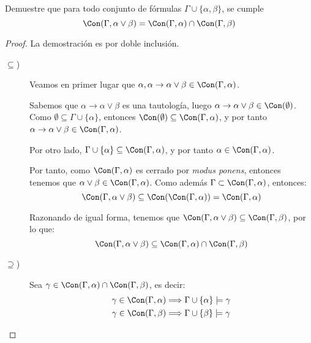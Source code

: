 \begin{ejercicio}
    Demuestre que para todo conjunto de fórmulas $\Gamma\cup\{\alpha,\beta\}$, se cumple
    \begin{equation*}
        \Con(\Gamma,\alpha\lor\beta) = \Con(\Gamma,\alpha) \cap \Con(\Gamma,\beta)
    \end{equation*}

    \begin{proof}
        La demostración es por doble inclusión.
        \begin{description}
            \item [$\subseteq$)] Veamos en primer lugar que $\alpha, \alpha\rightarrow\alpha\lor\beta\in \Con(\Gamma,\alpha)$.
            
                Sabemos que $\alpha\rightarrow\alpha\lor\beta$ es una tautología, luego
                $\alpha\rightarrow\alpha\lor\beta\in \Con(\emptyset)$.
                Como $\emptyset\subseteq \Gamma\cup\{\alpha\}$, entonces $\Con(\emptyset)\subseteq \Con(\Gamma,\alpha)$, y por tanto $\alpha\rightarrow\alpha\lor\beta\in \Con(\Gamma,\alpha)$.

                Por otro lado, $\Gamma\cup \{\alpha\}\subseteq \Con(\Gamma,\alpha)$, y por tanto $\alpha\in \Con(\Gamma,\alpha)$.

                Por tanto, como $\Con(\Gamma,\alpha)$ es cerrado por \emph{modus ponens}, entonces tenemos que $\alpha\lor\beta\in \Con(\Gamma,\alpha)$.
                Como además $\Gamma\subset \Con(\Gamma,\alpha)$, entonces:
                \begin{equation*}
                    \Con(\Gamma,\alpha\lor\beta)\subseteq \Con(\Con(\Gamma,\alpha)) = \Con(\Gamma,\alpha)
                \end{equation*}

                Razonando de igual forma, tenemos que $\Con(\Gamma,\alpha\lor\beta)\subseteq \Con(\Gamma,\beta)$, por lo que:
                \begin{equation*}
                    \Con(\Gamma,\alpha\lor\beta)\subseteq \Con(\Gamma,\alpha)\cap \Con(\Gamma,\beta)
                \end{equation*}

            \item [$\supseteq$)] Sea $\gamma\in \Con(\Gamma,\alpha)\cap \Con(\Gamma,\beta)$, es decir:
                \begin{align*}
                    \gamma\in \Con(\Gamma,\alpha) &\Longrightarrow \Gamma \cup \{\alpha\} \models \gamma \\
                    \gamma\in \Con(\Gamma,\beta) &\Longrightarrow \Gamma \cup \{\beta\} \models \gamma
                \end{align*}
                

\end{description}
\end{proof}
\end{ejercicio}
